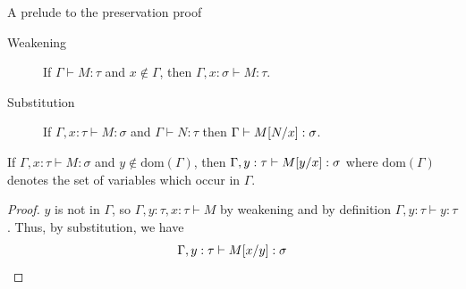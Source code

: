 \begin{frame}{A prelude to the preservation proof}
    \begin{description}
      \item[Weakening] If $\Gamma \vdash M : \tau$ and $x \not\in \Gamma$, then
        $\Gamma, x : \sigma \vdash M : \tau$. 
      \item[Substitution] If $\Gamma, x : \tau \vdash M : \sigma$ and $\Gamma
        \vdash N : \tau$ then $\Gamma \vdash M[{N}/{x}] : \sigma$.
    \end{description}

  \begin{corollary}
    If $\Gamma, x : \tau \vdash M :\sigma$ and $y \not\in \mathrm{dom}(\Gamma)$, then $ \Gamma, y : \tau \vdash M[{y}/{x}] :
    \sigma$
    where $\mathrm{dom}(\Gamma)$
    denotes the set of variables which occur in $\Gamma$.
  \end{corollary}
  \begin{proof}
    $y$ is not in $\Gamma$, so 
      $\Gamma, y : \tau, x : \tau \vdash M$
    by weakening and by definition $\Gamma, y : \tau \vdash y : \tau$.
    Thus, by substitution, we have
    \[
      \Gamma, y : \tau \vdash M[{x}/{y}] : \sigma
    \]
  \end{proof}
\end{frame}

